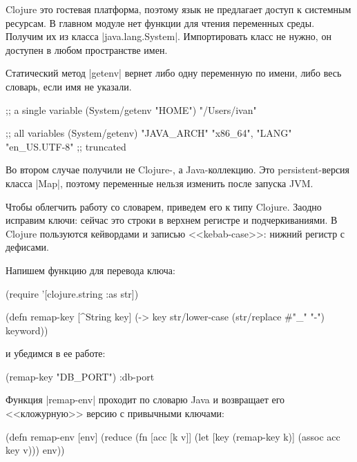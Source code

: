 Clojure это гостевая платформа, поэтому язык не предлагает доступ к системным
ресурсам. В главном модуле нет функции для чтения переменных среды. Получим их
из класса \spverb|java.lang.System|. Импортировать класс не нужно, он доступен в
любом пространстве имен.

Статический метод \spverb|getenv| вернет либо одну переменную по имени, либо
весь словарь, если имя не указали.

\begin{english}
  \begin{clojure}
;; a single variable
(System/getenv "HOME")
"/Users/ivan"

;; all variables
(System/getenv)
{"JAVA_ARCH" "x86_64", "LANG" "en_US.UTF-8"} ;; truncated
  \end{clojure}
\end{english}

Во втором случае получили не Clojure-, а Java-коллекцию. Это persistent-версия
класса \spverb|Map|, поэтому переменные нельзя изменить после запуска JVM.


Чтобы облегчить работу со словарем, приведем его к типу Clojure. Заодно исправим
ключи: сейчас это строки в верхнем регистре и подчеркиваниями. В Clojure
пользуются кейвордами и записью <<kebab-case>>: нижний регистр с дефисами.

Напишем функцию для перевода ключа:

\begin{english}
  \begin{clojure}
(require '[clojure.string :as str])

(defn remap-key [^String key]
  (-> key
      str/lower-case
      (str/replace #"_" "-")
      keyword))
  \end{clojure}
\end{english}

\noindent
и убедимся в ее работе:

\begin{english}
  \begin{clojure}
(remap-key "DB_PORT")
:db-port
  \end{clojure}
\end{english}

Функция \spverb|remap-env| проходит по словарю Java и возвращает его
<<кложурную>> версию с привычными ключами:

\begin{english}
  \begin{clojure}
(defn remap-env [env]
  (reduce
   (fn [acc [k v]]
     (let [key (remap-key k)]
       (assoc acc key v)))
   {}
   env))
  \end{clojure}
\end{english}

